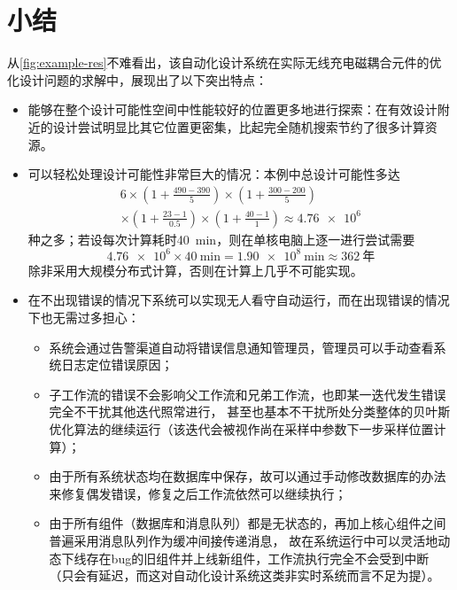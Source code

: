 \documentclass[index]{subfiles}
\begin{document}
\section{小结}
从\cref{fig:example-res}不难看出，该自动化设计系统在实际无线充电磁耦合元件的优化设计问题的求解中，展现出了以下突出特点：
\begin{itemize}
  \item 能够在整个设计可能性空间中性能较好的位置更多地进行探索：在有效设计附近的设计尝试明显比其它位置更密集，比起完全随机搜索节约了很多计算资源。
  \item 可以轻松处理设计可能性非常巨大的情况：本例中总设计可能性多达
  \[\begin{multlined}6\times\left(1+\frac{490-390}{5}\right)\times\left(1+\frac{300-200}{5}\right) \\
  \times\left(1+\frac{23-1}{0.5}\right)\times\left(1+\frac{40-1}{1}\right)\approx\num{4.76e6}\end{multlined}\]
  种之多；若设每次计算耗时\SI{40}{\minute}，则在单核电脑上逐一进行尝试需要
  \[\num{4.76e6}\times\SI{40}{\minute}=\SI{1.90e8}{\minute}\approx\num{362}\ \text{年}\]
  除非采用大规模分布式计算，否则在计算上几乎不可能实现。
  \item 在不出现错误的情况下系统可以实现无人看守自动运行，而在出现错误的情况下也无需过多担心：
  \begin{itemize}
    \item 系统会通过告警渠道自动将错误信息通知管理员，管理员可以手动查看系统日志定位错误原因；
    \item 子工作流的错误不会影响父工作流和兄弟工作流，也即某一迭代发生错误完全不干扰其他迭代照常进行，
    甚至也基本不干扰所处分类整体的贝叶斯优化算法的继续运行（该迭代会被视作尚在采样中参数下一步采样位置计算）；
    \item 由于所有系统状态均在数据库中保存，故可以通过手动修改数据库的办法来修复偶发错误，修复之后工作流依然可以继续执行；
    \item 由于所有组件（数据库和消息队列）都是无状态的，再加上核心组件之间普遍采用消息队列作为缓冲间接传递消息，
    故在系统运行中可以灵活地动态下线存在bug的旧组件并上线新组件，工作流执行完全不会受到中断（只会有延迟，而这对自动化设计系统这类非实时系统而言不足为提）。
  \end{itemize}
\end{itemize}
\end{document}
